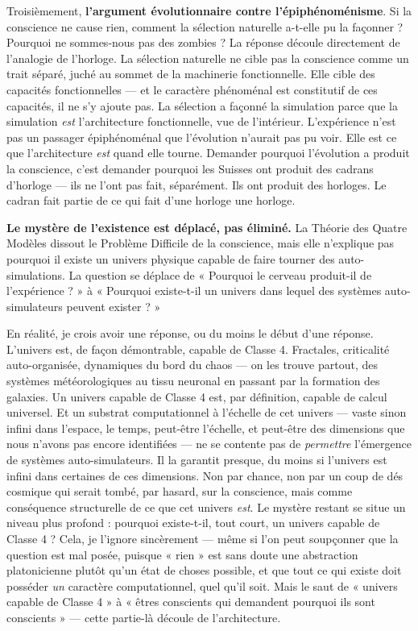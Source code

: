 \documentclass[11pt, twoside, openright]{book}
\begin{document}
Troisièmement, \textbf{l'argument évolutionnaire contre l'épiphénoménisme}. Si la conscience ne cause rien, comment la sélection naturelle a-t-elle pu la façonner ? Pourquoi ne sommes-nous pas des zombies ? La réponse découle directement de l'analogie de l'horloge. La sélection naturelle ne cible pas la conscience comme un trait séparé, juché au sommet de la machinerie fonctionnelle. Elle cible des capacités fonctionnelles --- et le caractère phénoménal est constitutif de ces capacités, il ne s'y ajoute pas. La sélection a façonné la simulation parce que la simulation \textit{est} l'architecture fonctionnelle, vue de l'intérieur. L'expérience n'est pas un passager épiphénoménal que l'évolution n'aurait pas pu voir. Elle est ce que l'architecture \textit{est} quand elle tourne. Demander pourquoi l'évolution a produit la conscience, c'est demander pourquoi les Suisses ont produit des cadrans d'horloge --- ils ne l'ont pas fait, séparément. Ils ont produit des horloges. Le cadran fait partie de ce qui fait d'une horloge une horloge.

\textbf{Le mystère de l'existence est déplacé, pas éliminé.} La Théorie des Quatre Modèles dissout le Problème Difficile de la conscience, mais elle n'explique pas pourquoi il existe un univers physique capable de faire tourner des auto-simulations. La question se déplace de « Pourquoi le cerveau produit-il de l'expérience ? » à « Pourquoi existe-t-il un univers dans lequel des systèmes auto-simulateurs peuvent exister ? »

En réalité, je crois avoir une réponse, ou du moins le début d'une réponse. L'univers est, de façon démontrable, capable de Classe 4. Fractales, criticalité auto-organisée, dynamiques du bord du chaos --- on les trouve partout, des systèmes météorologiques au tissu neuronal en passant par la formation des galaxies. Un univers capable de Classe 4 est, par définition, capable de calcul universel. Et un substrat computationnel à l'échelle de cet univers --- vaste sinon infini dans l'espace, le temps, peut-être l'échelle, et peut-être des dimensions que nous n'avons pas encore identifiées --- ne se contente pas de \textit{permettre} l'émergence de systèmes auto-simulateurs. Il la garantit presque, du moins si l'univers est infini dans certaines de ces dimensions. Non par chance, non par un coup de dés cosmique qui serait tombé, par hasard, sur la conscience, mais comme conséquence structurelle de ce que cet univers \textit{est}. Le mystère restant se situe un niveau plus profond : pourquoi existe-t-il, tout court, un univers capable de Classe 4 ? Cela, je l'ignore sincèrement --- même si l'on peut soupçonner que la question est mal posée, puisque « rien » est sans doute une abstraction platonicienne plutôt qu'un état de choses possible, et que tout ce qui existe doit posséder \textit{un} caractère computationnel, quel qu'il soit. Mais le saut de « univers capable de Classe 4 » à « êtres conscients qui demandent pourquoi ils sont conscients » --- cette partie-là découle de l'architecture.
\end{document}
